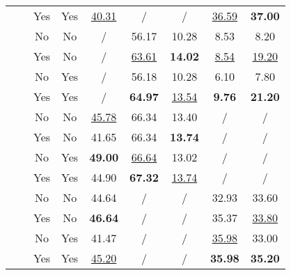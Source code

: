 \begin{table*}[h!]
{\begin{tabular}{c c c c c c c c c}
                                                                         &             & Yes & Yes & \underline{40.31}& /& /& \underline{36.59}&\textbf{37.00}\\ 
                                           &  & No & No & / & 56.17 & 10.28 & 8.53 & 8.20 \\  
                                                                           &             & Yes & No & / & \underline{63.61} & \textbf{14.02}& \underline{8.54} & \underline{19.20} \\  
                                                                           &             & No & Yes & /& 56.18& 10.28& 6.10& 7.80\\   
                                                                           &             & Yes& Yes& /& \textbf{64.97}& \underline{13.54}& \textbf{9.76}& \textbf{21.20}\\ \hline
{} &  & No & No & \underline{45.78}& 66.34& 13.40& / & / \\  
                                                                         &                           & Yes & No & 41.65& 66.34 & \textbf{13.74}& /& /\\   
                                                                         &                           & No & Yes & \textbf{49.00}& \underline{66.64}& 13.02& /& /\\   
                                                                         &                           & Yes & Yes & 44.90& \textbf{67.32}& \underline{13.74}& /&/\\ 
                                           &  & No & No & 44.64& / & / & 32.93& 33.60\\  
                                                                         &             & Yes &No & \textbf{46.64}& / & / & 35.37 & \underline{33.80} \\    
                                                                         &             & No & Yes & 41.47& /& /& \underline{35.98}& 33.00\\   
                                                                         &             & Yes & Yes & \underline{45.20}& /& /& \textbf{35.98}& \textbf{35.20}\\ 

\end{tabular}}
\end{table*}
